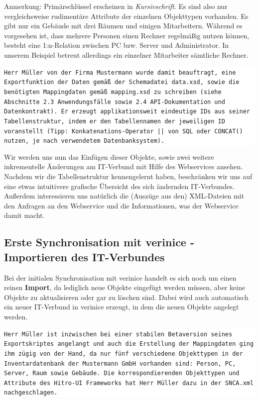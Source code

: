 \documentclass[a4paper,10pt]{book}
\begin{document}
\newline
Anmerkung: Primärschlüssel erscheinen in \textit{Kursivschrift}.
\newline
Es sind also nur vergleichsweise rudimentäre Attribute der einzelnen Objekttypen vorhanden. Es gibt nur ein
Gebäude mit drei Räumen und einigen Mitarbeitern. Während es vorgesehen ist, dass mehrere Personen einen Rechner
regelmäßig nutzen können, besteht eine 1:n-Relation zwischen PC bzw. Server und Administrator. In unserem
Beispiel betreut allerdings ein einzelner Mitarbeiter sämtliche Rechner.
\newline\newline
\colorbox{white}{\parbox{\textwidth}{
{\tt Herr Müller von der Firma Mustermann wurde damit beauftragt, eine Exportfunktion der Daten gemäß der Schemadatei data.xsd, sowie die benötigten
Mappingdaten gemäß mapping.xsd zu schreiben (siehe Abschnitte 2.3 Anwendungsfälle sowie 2.4 API-Dokumentation und Datenkontrakt).
Er erzeugt applikationsweit eindeutige IDs aus seiner Tabellenstruktur, indem er den Tabellennamen der jeweiligen ID voranstellt
(Tipp: Konkatenations-Operator || von SQL oder CONCAT() nutzen, je nach verwendetem Datenbanksystem).}
}}
\newline\newline
Wir werden uns nun das Einfügen dieser Objekte, sowie zwei weitere inkrementelle Änderungen am IT-Verbund mit
Hilfe des Webservices ansehen. Nachdem wir die Tabellenstruktur kennengelernt haben, beschränken wir uns auf
eine etwas intuitivere grafische Übersicht des sich ändernden IT-Verbundes. Außerdem interessieren uns natürlich
die (Auszüge aus den) XML-Dateien mit den Anfragen an den Webservice und die Informationen, was der Webservice damit macht.

\subsection{ Erste Synchronisation mit verinice - Importieren des IT-Verbundes}
Bei der initialen Synchronisation mit verinice handelt es sich noch um einen reinen \textbf{Import}, da lediglich neue
Objekte eingefügt werden müssen, aber keine Objekte zu aktualisieren oder gar zu löschen sind. Dabei wird auch automatisch
ein neuer IT-Verbund in verinice erzeugt, in dem die neuen Objekte angelegt werden.

\colorbox{white}{\parbox{\textwidth}{\tt Herr Müller ist inzwischen bei einer
stabilen Betaversion seines Exportskriptes angelangt und auch die Erstellung der
Mappingdaten ging ihm zügig von der Hand, da nur fünf verschiedene Objekttypen
in der Inventardatenbank der Mustermann GmbH vorhanden sind: Person, PC, Server,
Raum sowie Gebäude. Die korrespondierenden Objekttypen und Attribute des
Hitro-UI Frameworks hat Herr Müller dazu in der SNCA.xml nachgeschlagen.}}
\end{document}

